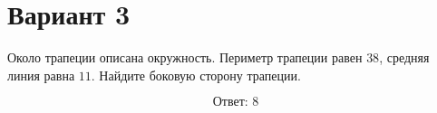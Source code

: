 \documentclass[12pt,a4paper]{article}
\begin{document}
\section*{Вариант 3}

Около трапеции описана окружность. Периметр трапеции равен \(38\),
средняя линия равна \(11\). Найдите боковую сторону трапеции.

\begin{center}\figCyclicTrapezoid\end{center}

\[
\boxed{\text{Ответ: }8}
\]
\end{document}
